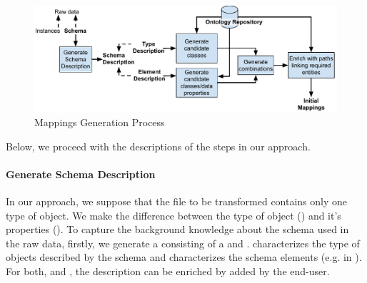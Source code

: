 \begin{figure}
	\centering
	\includegraphics[scale=0.55]{images/GeneralApproachPaper1.pdf}
	\caption{Mappings Generation Process}
	\label{fig:overviewApproach}
\end{figure}

Below, we proceed with the descriptions of the steps in our approach.

\paragraph{Generate Schema Description}
In our approach, we suppose that the file to be transformed contains only one type of object. We make the difference between the type of object () and it's properties (). To capture the background knowledge about the schema used in the raw data, firstly, we generate a  consisting of a  and .
 characterizes the type of objects described by the schema and  characterizes the schema elements (e.g.  in ). For both,  and , the description can be enriched by  added by the end-user.

